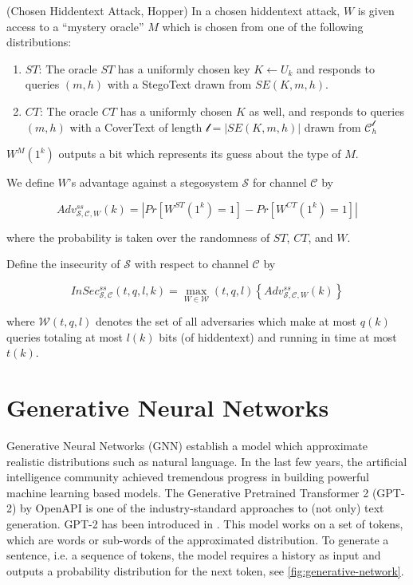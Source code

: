 \documentclass[english,version-2020-11]{uzl-thesis}
\begin{document}
\begin{definition}
(Chosen Hiddentext Attack, Hopper) In a chosen hiddentext attack, $W$ is given access to a ``mystery oracle'' $M$ which is chosen from one of the following distributions:

\begin{enumerate}
\item $ST$: The oracle $ST$ has a uniformly chosen key $K \leftarrow U_k$ and responds to queries $(m, h)$ with a StegoText drawn from $SE(K, m, h)$.
\item $CT$: The oracle $CT$ has a uniformly chosen $K$ as well, and responds to queries $(m, h)$ with a CoverText of length $\mathcal{l} = |SE(K, m, h)|$ drawn from $\mathcal{C}_h^{\mathcal{l}}$
\end{enumerate}

$W^M(1^k)$ outputs a bit which represents its guess about the type of $M$.

We define $W$'s advantage against a stegosystem $\mathcal{S}$ for channel $\mathcal{C}$ by

$$Adv_{\mathcal{S}, \mathcal{C}, W}^{ss}(k) = |Pr[W^{ST}(1^k)=1] - Pr[W^{CT}(1^k)=1]|$$

where the probability is taken over the randomness of $ST$, $CT$, and $W$. 

Define the insecurity of $\mathcal{S}$ with respect to channel $\mathcal{C}$ by

$$InSec_{\mathcal{S}, \mathcal{C}}^{ss}(t, q, l, k) = \max_{W \in \mathcal{W}}(t, q, l) \left\{ Adv_{\mathcal{S}, \mathcal{C}, W}^{ss}(k) \right\}$$

where $\mathcal{W}(t, q, l)$ denotes the set of all adversaries which make at most $q(k)$ queries totaling at most $l(k)$ bits (of hiddentext) and running in time at most $t(k)$.
\end{definition}

\section{Generative Neural Networks}

Generative Neural Networks (GNN) establish a model which approximate realistic distributions such as natural language.
In the last few years, the artificial intelligence community achieved tremendous progress in building powerful machine learning based models.
The Generative Pretrained Transformer 2 (GPT-2) by OpenAPI is one of the industry-standard approaches to (not only) text generation.
GPT-2 has been introduced in \cite{OpenAI19}.
This model works on a set of tokens, which are words or sub-words of the approximated distribution.
To generate a sentence, i.e. a sequence of tokens, the model requires a history as input and outputs a probability distribution for the next token, see \autoref{fig:generative-network}.
\end{document}
